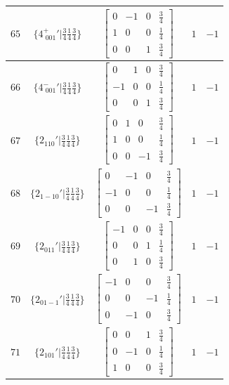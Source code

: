 \documentclass[fleqn,8pt]{jsarticle}
\begin{document}
\begin{longtable}{ccccc}
$ 65 $ & $ \{4^{+}_{\,\,001}{}'|\frac{3}{4} \frac{1}{4} \frac{3}{4}\} $ & $ \begin{bmatrix} 0 & -1 & 0 & \frac{3}{4} \\ 1 & 0 & 0 & \frac{1}{4} \\ 0 & 0 & 1 & \frac{3}{4} \end{bmatrix} $ & $ 1 $ & $ -1 $ \\ \hline
$ 66 $ & $ \{4^{-}_{\,\,001}{}'|\frac{3}{4} \frac{1}{4} \frac{3}{4}\} $ & $ \begin{bmatrix} 0 & 1 & 0 & \frac{3}{4} \\ -1 & 0 & 0 & \frac{1}{4} \\ 0 & 0 & 1 & \frac{3}{4} \end{bmatrix} $ & $ 1 $ & $ -1 $ \\ \hline
$ 67 $ & $ \{2{}_{110}{}'|\frac{3}{4} \frac{1}{4} \frac{3}{4}\} $ & $ \begin{bmatrix} 0 & 1 & 0 & \frac{3}{4} \\ 1 & 0 & 0 & \frac{1}{4} \\ 0 & 0 & -1 & \frac{3}{4} \end{bmatrix} $ & $ 1 $ & $ -1 $ \\ \hline
$ 68 $ & $ \{2{}_{1-10}{}'|\frac{3}{4} \frac{1}{4} \frac{3}{4}\} $ & $ \begin{bmatrix} 0 & -1 & 0 & \frac{3}{4} \\ -1 & 0 & 0 & \frac{1}{4} \\ 0 & 0 & -1 & \frac{3}{4} \end{bmatrix} $ & $ 1 $ & $ -1 $ \\ \hline
$ 69 $ & $ \{2{}_{011}{}'|\frac{3}{4} \frac{1}{4} \frac{3}{4}\} $ & $ \begin{bmatrix} -1 & 0 & 0 & \frac{3}{4} \\ 0 & 0 & 1 & \frac{1}{4} \\ 0 & 1 & 0 & \frac{3}{4} \end{bmatrix} $ & $ 1 $ & $ -1 $ \\ \hline
$ 70 $ & $ \{2{}_{01-1}{}'|\frac{3}{4} \frac{1}{4} \frac{3}{4}\} $ & $ \begin{bmatrix} -1 & 0 & 0 & \frac{3}{4} \\ 0 & 0 & -1 & \frac{1}{4} \\ 0 & -1 & 0 & \frac{3}{4} \end{bmatrix} $ & $ 1 $ & $ -1 $ \\ \hline
$ 71 $ & $ \{2{}_{101}{}'|\frac{3}{4} \frac{1}{4} \frac{3}{4}\} $ & $ \begin{bmatrix} 0 & 0 & 1 & \frac{3}{4} \\ 0 & -1 & 0 & \frac{1}{4} \\ 1 & 0 & 0 & \frac{3}{4} \end{bmatrix} $ & $ 1 $ & $ -1 $ \\ \hline

\end{longtable}
\end{document}
